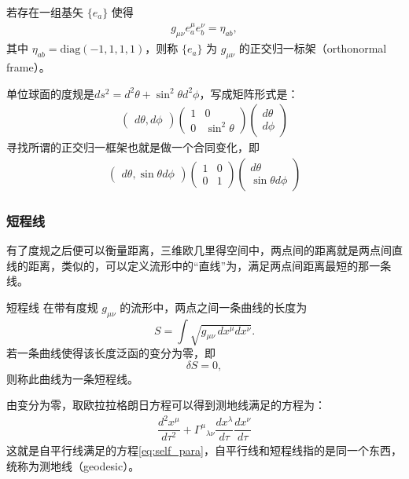 \begin{definition}[正交归一标架]
  若存在一组基矢 $\{ e_a \}$ 使得
\begin{align}
g_{\mu\nu} e_a^{\mu} e_b^{\nu} = \eta_{ab},
\end{align}
其中 $\eta_{ab} = \mathrm{diag}(-1,1,1,1)$，则称 $\{ e_a \}$ 为 $g_{\mu\nu}$ 的正交归一标架（orthonormal frame）。
\end{definition}

\begin{example}[球面]
  单位球面的度规是$ds^2 = d^2{\theta} + \sin ^2{\theta} d^2\phi$，写成矩阵形式是：
  \begin{align}
      \begin{pmatrix}
        d\theta, d\phi 
      \end{pmatrix}\begin{pmatrix}
    1 & 0 \\ 
    0 & \sin^2{\theta} 
  \end{pmatrix}\begin{pmatrix}
      d \theta \\
      d \phi
    \end{pmatrix}
  \end{align}
寻找所谓的正交归一框架也就是做一个合同变化，即
  \begin{align}
      \begin{pmatrix}
        d\theta, \sin{\theta}d\phi 
      \end{pmatrix}\begin{pmatrix}
    1 & 0 \\ 
    0 & 1 
  \end{pmatrix}
  \begin{pmatrix}
      d \theta \\
      \sin{\theta}d \phi
    \end{pmatrix}
  \end{align}
\end{example}

\subsubsection{短程线}
有了度规之后便可以衡量距离，三维欧几里得空间中，两点间的距离就是两点间直线的距离，类似的，可以定义流形中的“直线”为，满足两点间距离最短的那一条线。
\begin{definition}{短程线}
  在带有度规 $g_{\mu\nu}$ 的流形中，两点之间一条曲线的长度为
  \[
    S=\int \sqrt{g_{\mu\nu}\, dx^{\mu} dx^{\nu}} .
  \]
  若一条曲线使得该长度泛函的变分为零，即
  \[
    \delta S = 0,
  \]
  则称此曲线为一条短程线。
\end{definition}
由变分为零，取欧拉拉格朗日方程可以得到测地线满足的方程为：
\begin{align}
  \dfrac{d^2 x^\mu}{d\tau^2} + \Gamma^{\mu}{}_{\lambda \nu}\dfrac{dx^{\lambda}}{d\tau} \dfrac{dx^{\nu}}{d\tau}
\end{align}
这就是自平行线满足的方程\eqref{eq:self_para}，自平行线和短程线指的是同一个东西，统称为测地线（geodesic）。

